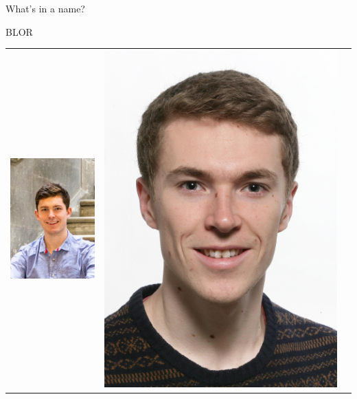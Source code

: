 \documentclass[xcolor=table,aspectratio=169]{beamer}
\numberwithin{equation}{section}
\begin{document}
\begin{frame}{What's in a name?}
    \begin{center}
        \huge BLOR
    \end{center}
    \begin{center}
        \footnotesize
        \begin{tabularx}{0.7\textwidth}{CCC}
            \includegraphics[height = 0.4\paperheight]{photos/andrew_burgess.png} &
            \includegraphics[height = 0.4\paperheight]{photos/linscott.jpg}       &

\end{tabularx}
\end{center}
\end{frame}
\end{document}
